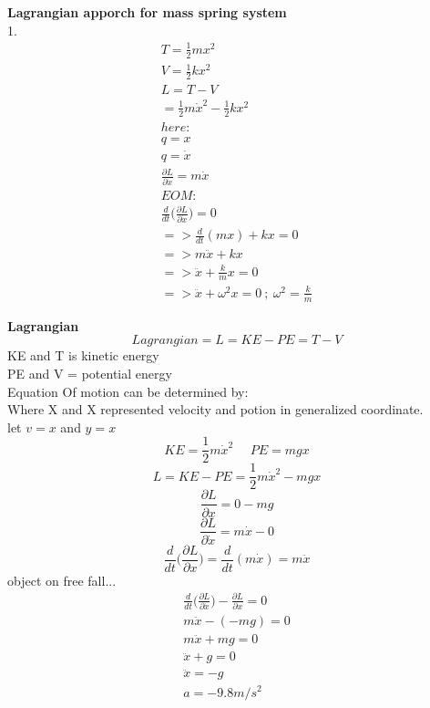	\textbf{Lagrangian apporch for mass spring system} \\
	1.
	\begin{align}
		T = \frac{1}{2}mx^2 \\
		V = \frac{1}{2}kx^2 \\
		L = T - V \\
		= \frac{1}{2}m\dot{x}^2 - \frac{1}{2}kx^2 \\
		here: \\
		q= x \\
		q = \dot{x} \\
		\frac{\partial L}{\partial \dot{x}} = m\dot{x} \\
		EOM:\\
		\frac{d}{dt}\bigg(\frac{\partial L}{\partial \dot{x}}\bigg) = 0 \\
		=>\frac{d}{dt}(mx)+kx = 0 \\
		=>m\ddot{x}+kx \\
		=>\ddot{x}+\frac{k}{m}x = 0 \\
		=>\ddot{x}+\omega^2x = 0 \ ; \ \omega^2 = \frac{k}{m}
	\end{align}
	
	
	
	
	
	
	\textbf{Lagrangian}
	\begin{equation}
		Lagrangian = L = KE - PE = T - V
	\end{equation}
	KE and T is kinetic energy \\
	PE and V =  potential energy \\
	Equation Of motion can be determined by: \\
	Where X and X represented velocity and potion in generalized coordinate.\\
	let $v = x$ and $y = x$ \\
	\begin{equation}
	KE = \frac{1}{2}m\dot{x}^2 \ \ \ \ \ \ PE = mgx
	\end{equation}
	\begin{equation}
		L = KE - PE = \frac{1}{2}m\dot{x}^2 - mgx
	\end{equation}
	\begin{equation}
		\frac{\partial L}{\partial x} = 0 - mg
	\end{equation}
	\begin{equation}
	\frac{\partial L}{\partial \dot{x}} = m\dot{x} - 0
	\end{equation}
	\begin{equation}
		\frac{d}{dt}\bigg(\frac{\partial L}{\partial x}\bigg) = \frac{d}{dt}(m\dot{x}) = m \ddot{x}
	\end{equation}
	object on free fall...
	\begin{align}
		\frac{d}{dt}\bigg(\frac{\partial L}{\partial \dot{x}}\bigg) - \frac{\partial L}{\partial x} = 0 \\
		m\ddot{x} - (-mg) = 0 \\
		m\ddot{x}+mg = 0 \\
		\ddot{x} + g = 0 \\
		\ddot{x } = - g \\
		 a = - 9.8 m/s^2
	\end{align}
	
